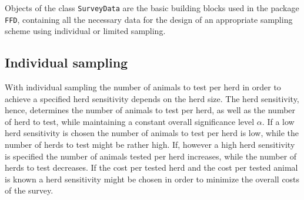 \documentclass[nojss]{jss}
\begin{document}
\begin{Schunk}
\end{Schunk}

 Objects of the class 
\texttt{SurveyData} are the basic building blocks used in the 
package \texttt{FFD}, containing all the necessary data for the 
design of an appropriate sampling scheme using individual or limited
sampling. 


\subsection{Individual sampling} 
\label{subsec:ind-sampling}

With individual sampling the number of animals to test per herd in
order to achieve a specified herd sensitivity depends on the herd
size. The herd sensitivity, hence, determines the number of animals
to test per herd, as well as the number of herd to test, while
maintaining a constant overall significance level $\alpha$. If a low
herd sensitivity is chosen the number of animals to test per herd is
low, while the number of herds to test might be rather high. If,
however a high herd sensitivity is specified the number of animals
tested per herd increases, while the number of herds to test
decreases. If the cost per tested herd and the cost per tested
animal is known a herd sensitivity might be chosen in order to
minimize the overall costs of the survey.
\end{document}
